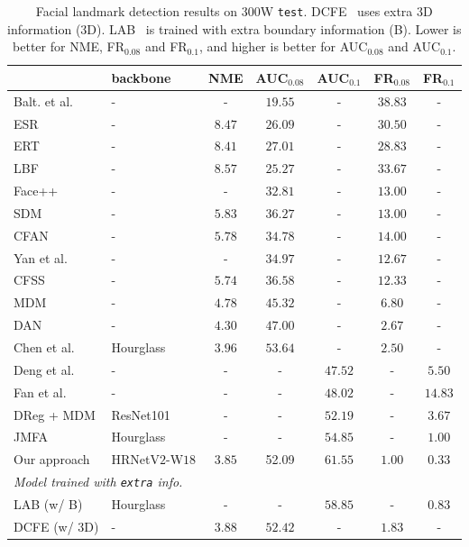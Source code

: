 \documentclass[10pt,journal,compsoc]{IEEEtran}
\begin{document}
\renewcommand{\arraystretch}{1.3}
\begin{table}[t]
\setlength{\tabcolsep}{13pt}
\scriptsize
\centering
\caption{Facial landmark detection results on $300$W \texttt{test}.
DCFE~\cite{ValleBVB18} uses extra 3D information (3D).
LAB~\cite{Wu0YWC018} is trained with extra boundary information (B).
Lower is better for NME, FR$_{0.08}$ and FR$_{0.1}$, 
and higher is better for AUC$_{0.08}$ and AUC$_{0.1}$.}
\label{table:comparison_300w_testset}
\begin{tabular}{l|l|c|c|c|c|c}
\hline\noalign{\smallskip}
 & backbone &NME & AUC$_{0.08}$ & AUC$_{0.1}$ & FR$_{0.08}$ & FR$_{0.1}$\\
\hline

\hline
Balt. et al. \cite{Baltrusaitis0M13} & - & - &$19.55$ &-& $38.83$ & -\\
ESR \cite{CaoWWS12}& - &$8.47$ & $26.09$ & - & $30.50$ & - \\
ERT \cite{KazemiS14}& - &$8.41$ & $27.01$ & - & $28.83$ & - \\
LBF \cite{RenCW014}& - &$8.57$ & $25.27$ & - & $33.67$ & - \\
Face++ \cite{ZhouFCJY13} & - & - &$32.81$ & - & $13.00$ & - \\
SDM \cite{XiongT13}& - &$5.83$ & $36.27$ & - & $13.00$ & - \\
CFAN \cite{ZhangSKC14}& - &$5.78$ & $34.78$ & - & $14.00$ & - \\
Yan et al. \cite{YanLYL13} & -&- &$34.97$&-&$12.67$&-\\
CFSS \cite{ZhuLLT15}& - &$5.74$ & $36.58$ & - & $12.33$ & - \\
MDM \cite{TrigeorgisSNAZ16}& - &$4.78$ & $45.32$ & - & $6.80$ & - \\
DAN \cite{KowalskiNT17}& - &$4.30$ & $47.00$ & - & $2.67$ & - \\
Chen et al. \cite{ChenSWLY17}& Hourglass &$3.96$ & $\mathbf{53.64}$ & - & $2.50$ & - \\
Deng et al. \cite{DengLYT16}& - & - & - & $47.52$ & - & $5.50$ \\
Fan et al. \cite{FanZ16}& - &- & - & $48.02$ & - & $14.83$ \\
DReg + MDM \cite{GulerTASZK17}& ResNet101 &- & - & $52.19$ & - & $3.67$ \\
JMFA \cite{DengTZZ17}&Hourglass &- & - & $54.85$ & - & $1.00$ \\
\hline
Our approach & HRNetV$2$-W$18$& $\mathbf{3.85}$  & 52.09  & $\mathbf{61.55}$ & $\mathbf{1.00}$ & $\mathbf{0.33}$  \\
\hline

\hline
\multicolumn{3}{l}{
\emph {Model trained with \texttt{extra} info.}}\\
\hline
LAB (w/ B) \cite{Wu0YWC018}& Hourglass &- & -& $58.85$ & - & $0.83$ \\
DCFE (w/ $3$D) \cite{ValleBVB18}& - &$3.88$ & $52.42$ & - & $1.83$ & - \\
\hline
\end{tabular} 
\end{table}
\end{document}
